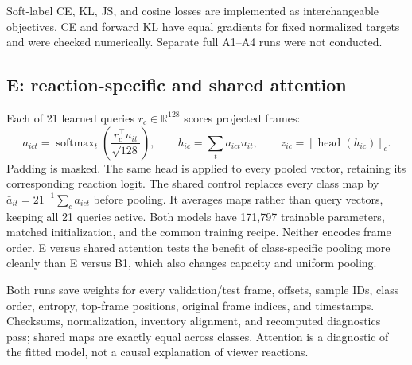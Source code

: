 \documentclass[11pt,a4paper]{article}
\newcommand{\tbl}[1]{\FloatBarrier}
\newcommand{\softmax}{\operatorname{softmax}}
\begin{document}
Soft-label CE, KL, JS, and cosine losses are implemented as interchangeable objectives. CE and forward KL have equal gradients for fixed normalized targets and were checked numerically. Separate full A1--A4 runs were not conducted.
\subsection{E: reaction-specific and shared attention}
Each of 21 learned queries $r_c\in\mathbb{R}^{128}$ scores projected frames:
\begin{equation}
a_{ict}=\softmax_t\!\left(\frac{r_c^\top u_{it}}{\sqrt{128}}\right),\qquad
h_{ic}=\sum_t a_{ict}u_{it},\qquad z_{ic}=[\operatorname{head}(h_{ic})]_c.
\end{equation}
Padding is masked. The same head is applied to every pooled vector, retaining its corresponding reaction logit. The shared control replaces every class map by $\bar a_{it}=21^{-1}\sum_c a_{ict}$ before pooling. It averages maps rather than query vectors, keeping all 21 queries active. Both models have 171,797 trainable parameters, matched initialization, and the common training recipe. Neither encodes frame order. E versus shared attention tests the benefit of class-specific pooling more cleanly than E versus B1, which also changes capacity and uniform pooling.

Both runs save weights for every validation/test frame, offsets, sample IDs, class order, entropy, top-frame positions, original frame indices, and timestamps. Checksums, normalization, inventory alignment, and recomputed diagnostics pass; shared maps are exactly equal across classes. Attention is a diagnostic of the fitted model, not a causal explanation of viewer reactions.
\tbl{selection}
\end{document}
